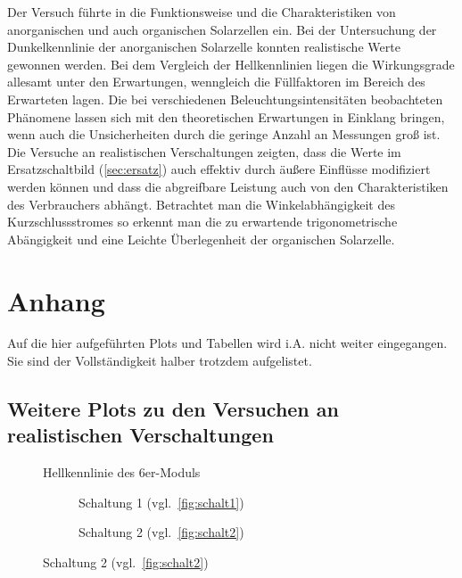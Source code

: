 \documentclass[slug=SZ, room=Hermann-Krone-Bau\,\ Labor\ 1.25,
supervisor=Martin\ Kroll, coursedate=14.\ 11.\ 2019]{../../Lab_Report_LaTeX/lab_report}
\begin{document}
Der Versuch f\"uhrte in die Funktionsweise und die Charakteristiken
von anorganischen und auch organischen Solarzellen ein. Bei der
Untersuchung der Dunkelkennlinie der anorganischen Solarzelle konnten
realistische Werte gewonnen werden. Bei dem Vergleich der
Hellkennlinien liegen die Wirkungsgrade allesamt unter den
Erwartungen, wenngleich die F\"ullfaktoren im Bereich des Erwarteten
lagen. Die bei verschiedenen Beleuchtungsintensitäten beobachteten
Ph\"anomene lassen sich mit den theoretischen Erwartungen in Einklang
bringen, wenn auch die Unsicherheiten durch die geringe Anzahl an
Messungen groß ist. Die Versuche an realistischen Verschaltungen
zeigten, dass die Werte im Ersatzschaltbild (\ref{sec:ersatz}) auch
effektiv durch \"au\ss{}ere Einfl\"usse modifiziert werden k\"onnen
und dass die abgreifbare Leistung auch von den Charakteristiken des
Verbrauchers abh\"angt. Betrachtet man die Winkelabhängigkeit des
Kurzschlussstromes so erkennt man die zu erwartende trigonometrische
Ab\"angigkeit und eine Leichte \"Uberlegenheit der organischen
Solarzelle.

\section{Anhang}
Auf die hier aufgef\"uhrten Plots und Tabellen wird i.A. nicht weiter
eingegangen. Sie sind der Vollst\"andigkeit halber trotzdem aufgelistet.

\label{sec:anh}

\subsection{Weitere Plots zu den Versuchen an realistischen Verschaltungen}
\label{sec:plotsc}

\begin{figure}[H]\centering
        
        \caption{Hellkennlinie des 6er-Moduls}
        \label{diag:hell6er}
\end{figure}

\begin{figure}[H]\centering
  \begin{subfigure}[b]{1\textwidth}\centering
    
    \caption{Schaltung 1 (vgl.~\ref{fig:schalt1})}
    \label{diag:hellschalt1}
  \end{subfigure}
  \begin{subfigure}[b]{1\textwidth}\centering
    
    \caption{Schaltung 2 (vgl.~\ref{fig:schalt2})}
    \label{diag:hellschalt2}
  \end{subfigure}
\end{figure}
\end{document}
